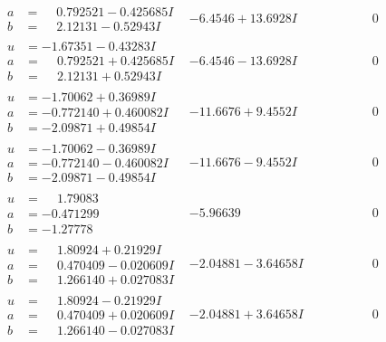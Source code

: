 \documentclass[1p]{elsarticle_modified}
\theoremstyle{definition}
\begin{document}
$$\begin{array}{c|c|c}
\begin{aligned}
a &= \phantom{-}0.792521 - 0.425685 I \\
b &= \phantom{-}2.12131 - 0.52943 I\end{aligned}
 & -6.4546 + 13.6928 I & \phantom{-0.000000 } 0 \\ \hline\begin{aligned}
u &= -1.67351 - 0.43283 I \\
a &= \phantom{-}0.792521 + 0.425685 I \\
b &= \phantom{-}2.12131 + 0.52943 I\end{aligned}
 & -6.4546 - 13.6928 I & \phantom{-0.000000 } 0 \\ \hline\begin{aligned}
u &= -1.70062 + 0.36989 I \\
a &= -0.772140 + 0.460082 I \\
b &= -2.09871 + 0.49854 I\end{aligned}
 & -11.6676 + 9.4552 I & \phantom{-0.000000 } 0 \\ \hline\begin{aligned}
u &= -1.70062 - 0.36989 I \\
a &= -0.772140 - 0.460082 I \\
b &= -2.09871 - 0.49854 I\end{aligned}
 & -11.6676 - 9.4552 I & \phantom{-0.000000 } 0 \\ \hline\begin{aligned}
u &= \phantom{-}1.79083\phantom{ +0.000000I} \\
a &= -0.471299\phantom{ +0.000000I} \\
b &= -1.27778\phantom{ +0.000000I}\end{aligned}
 & -5.96639\phantom{ +0.000000I} & \phantom{-0.000000 } 0 \\ \hline\begin{aligned}
u &= \phantom{-}1.80924 + 0.21929 I \\
a &= \phantom{-}0.470409 - 0.020609 I \\
b &= \phantom{-}1.266140 + 0.027083 I\end{aligned}
 & -2.04881 - 3.64658 I & \phantom{-0.000000 } 0 \\ \hline\begin{aligned}
u &= \phantom{-}1.80924 - 0.21929 I \\
a &= \phantom{-}0.470409 + 0.020609 I \\
b &= \phantom{-}1.266140 - 0.027083 I\end{aligned}
 & -2.04881 + 3.64658 I & \phantom{-0.000000 } 0 \\ \hline\begin{aligned}

\end{aligned}
\end{array}$$
\end{document}
